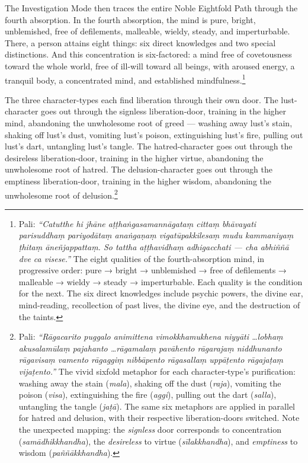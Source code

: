 The Investigation Mode then traces the entire Noble Eightfold Path through the fourth absorption. In the fourth absorption, the mind is pure, bright, unblemished, free of defilements, malleable, wieldy, steady, and imperturbable. There, a person attains eight things: six direct knowledges and two special distinctions. And this concentration is six-factored: a mind free of covetousness toward the whole world, free of ill-will toward all beings, with aroused energy, a tranquil body, a concentrated mind, and established mindfulness.\footnote{Pali: \textit{``Catutthe hi jhāne aṭṭhaṅgasamannāgataṃ cittaṃ bhāvayati parisuddhaṃ pariyodātaṃ anaṅgaṇaṃ vigatūpakkilesaṃ mudu kammaniyaṃ ṭhitaṃ āneñjappattaṃ. So tattha aṭṭhavidhaṃ adhigacchati --- cha abhiññā dve ca visese.''} The eight qualities of the fourth-absorption mind, in progressive order: pure → bright → unblemished → free of defilements → malleable → wieldy → steady → imperturbable. Each quality is the condition for the next. The six direct knowledges include psychic powers, the divine ear, mind-reading, recollection of past lives, the divine eye, and the destruction of the taints.}

The three character-types each find liberation through their own door. The lust-character goes out through the signless liberation-door, training in the higher mind, abandoning the unwholesome root of greed --- washing away lust's stain, shaking off lust's dust, vomiting lust's poison, extinguishing lust's fire, pulling out lust's dart, untangling lust's tangle. The hatred-character goes out through the desireless liberation-door, training in the higher virtue, abandoning the unwholesome root of hatred. The delusion-character goes out through the emptiness liberation-door, training in the higher wisdom, abandoning the unwholesome root of delusion.\footnote{Pali: \textit{``Rāgacarito puggalo animittena vimokkhamukhena niyyāti \ldots lobhaṃ akusalamūlaṃ pajahanto \ldots rāgamalaṃ pavāhento rāgarajaṃ niddhunanto rāgavisaṃ vamento rāgaggiṃ nibbāpento rāgasallaṃ uppāṭento rāgajaṭaṃ vijaṭento.''} The vivid sixfold metaphor for each character-type's purification: washing away the stain (\textit{mala}), shaking off the dust (\textit{raja}), vomiting the poison (\textit{visa}), extinguishing the fire (\textit{aggi}), pulling out the dart (\textit{salla}), untangling the tangle (\textit{jaṭā}). The same six metaphors are applied in parallel for hatred and delusion, with their respective liberation-doors switched. Note the unexpected mapping: the \textit{signless} door corresponds to concentration (\textit{samādhikkhandha}), the \textit{desireless} to virtue (\textit{sīlakkhandha}), and \textit{emptiness} to wisdom (\textit{paññākkhandha}).}

